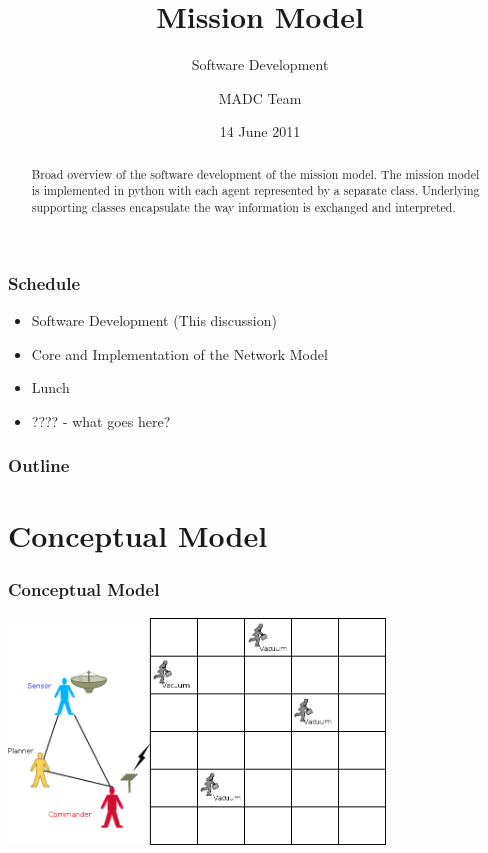 \documentclass{beamer}
\begin{document}
\title{Mission Model}
\subtitle{Software Development}
\author{MADC Team}
\date{14 June 2011}

\begin{frame}
  \titlepage
  \begin{abstract}
    Broad overview of the software development of the mission
    model. The mission model is implemented in python with each agent
    represented by a separate class. Underlying supporting classes
    encapsulate the way information is exchanged and interpreted.
  \end{abstract}
\end{frame}



\begin{frame}
  \frametitle{Schedule}

  \begin{itemize}
  \item Software Development (This discussion) 
  \item Core and Implementation of the Network Model
  \item Lunch
  \item ???? - what goes here?
  \end{itemize}

\end{frame}


\begin{frame}
  \frametitle{Outline}
\end{frame}



\section{Conceptual Model}


\begin{frame}
  \frametitle{Conceptual Model}

  \includegraphics[height=6cm]{conceptualWorld.png}

\end{frame}
\end{document}
